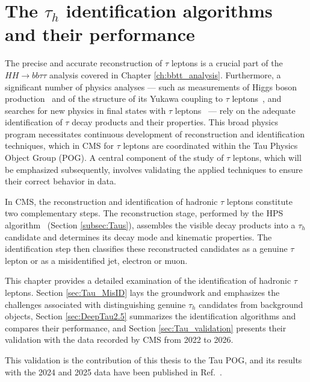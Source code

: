 \chapter{The \texorpdfstring{$\tau_h$}{τh} identification algorithms and their performance}
\label{ch:Tau}
%
The precise and accurate reconstruction of $\tau$ leptons is a crucial part of the $HH\rightarrow bb\tau\tau$ analysis covered in Chapter \ref{ch:bbtt_analysis}. Furthermore, a significant number of physics analyses — such as measurements of Higgs boson production~\cite{CMS-HIG-16-043,CMS-HIG-19-010} and of the \CP structure of its Yukawa coupling to $\tau$ leptons~\cite{CMS-HIG-20-006}, and searches for new physics in final states with $\tau$ leptons~\cite{CMS-HIG-21-001,CMS-PAS-EXO-24-012,CMS-PAS-EXO-24-020} — rely on the adequate identification of $\tau$ decay products and their properties. This broad physics program necessitates continuous development of reconstruction and identification techniques, which in CMS for $\tau$ leptons are coordinated within the Tau Physics Object Group (POG). A central component of the study of $\tau$ leptons, which will be emphasized subsequently, involves validating the applied techniques to ensure their correct behavior in data.

In CMS, the reconstruction and identification of hadronic $\tau$ leptons constitute two complementary steps. The reconstruction stage, performed by the HPS algorithm~\cite{CMS-TAU-14-001} (Section \ref{subsec:Taus}), assembles the visible decay products into a $\tau_h$ candidate and determines its decay mode and kinematic properties. The identification step then classifies these reconstructed candidates as a genuine $\tau$ lepton or as a misidentified jet, electron or muon.

This chapter provides a detailed examination of the identification of hadronic $\tau$ leptons. Section \ref{sec:Tau_MisID} lays the groundwork and emphasizes the challenges associated with distinguishing genuine $\tau_h$ candidates from background objects, Section \ref{sec:DeepTau2.5} summarizes the identification algorithms and compares their performance, and Section \ref{sec:Tau_validation} presents their validation with the data recorded by CMS from 2022 to 2026.\medskip

\noindent This validation is the contribution of this thesis to the Tau POG, and its results with the 2024 and 2025 data have been published in Ref.~\cite{CMS-DP-2025-074}.


